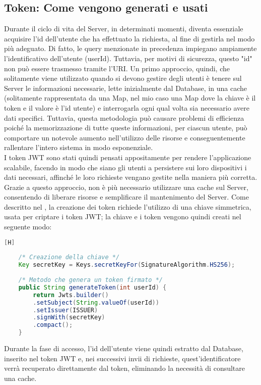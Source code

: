 \subsection{Token: Come vengono generati e usati} \label{section_token}
Durante il ciclo di vita del Server, in determinati momenti, diventa essenziale acquisire l'id dell'utente che ha effettuato la richiesta, al fine di gestirla nel modo più adeguato. Di fatto, le query menzionate in precedenza impiegano ampiamente l'identificativo dell'utente (userId). Tuttavia, per motivi di sicurezza, questo "id" non può essere trasmesso tramite l'URI. Un primo approccio, quindi, che solitamente viene utilizzato quando si devono gestire degli utenti è tenere sul Server le informazioni necessarie, lette inizialmente dal Database, in una cache (solitamente rappresentata da una Map, nel mio caso una Map dove la chiave è il token e il valore è l'id utente) e interrogarla ogni qual volta sia necessario avere dati specifici. Tuttavia, questa metodologia può causare problemi di efficienza poiché la memorizzazione di tutte queste informazioni, per ciascun utente, può comportare un notevole aumento nell'utilizzo delle risorse e conseguentemente rallentare l'intero sistema in modo esponenziale.\\
I token JWT sono stati quindi pensati appositamente per rendere l'applicazione scalabile, facendo in modo che siano gli utenti a persistere sui loro dispositivi i dati necessari, affinché le loro richieste vengano gestite nella maniera più corretta. Grazie a questo approccio, non è più necessario utilizzare una cache sul Server, consentendo di liberare risorse e semplificare il mantenimento del Server.
Come descritto nel , la creazione dei token richiede l'utilizzo di una chiave simmetrica, usata per criptare i token JWT; la chiave e i token vengono quindi creati nel seguente modo:
\begin{lstlisting}[language=Java, firstnumber=1][H]
	
	/* Creazione della chiave */
	Key secretKey = Keys.secretKeyFor(SignatureAlgorithm.HS256);
	
	/* Metodo che genera un token firmato */
	public String generateToken(int userId) {
		return Jwts.builder()
		.setSubject(String.valueOf(userId))
		.setIssuer(ISSUER)
		.signWith(secretKey)
		.compact();
	}
\end{lstlisting}
\noindent
Durante la fase di accesso, l'id  dell'utente viene quindi estratto dal Database, inserito nel token JWT e, nei successivi invii di richieste, quest'identificatore verrà recuperato direttamente dal token, eliminando la necessità di consultare una cache.\\
